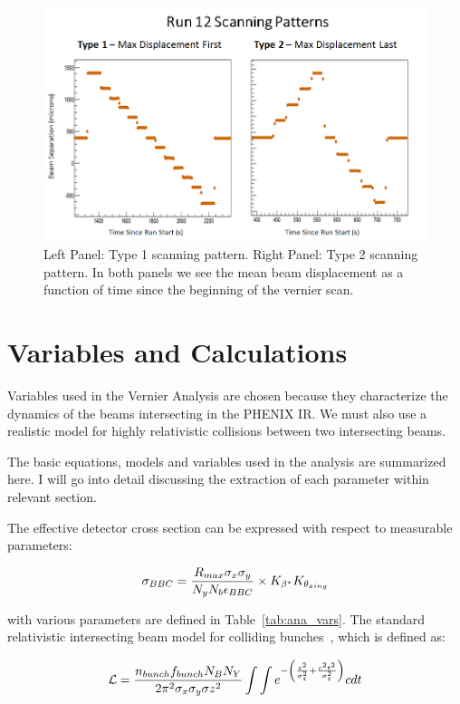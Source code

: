 \begin{figure}[ht] 
  \centering
  \includegraphics[width=0.75\linewidth]{./figures/scan_patterns} 
  \caption{ 
    Left Panel: Type 1 scanning pattern. Right Panel: Type 2 scanning pattern.
    In both panels we see the mean beam displacement as a function of time
    since the beginning of the vernier scan.
  }
  \label{fig:scan_patterns}
\end{figure}

\section{Variables and Calculations}
\label{sec:VariablesAndCalculations}

Variables used in the Vernier Analysis are chosen because they characterize the
dynamics of the beams intersecting in the PHENIX IR. We must also use a
realistic model for highly relativistic collisions between two intersecting
beams.

The basic equations, models and variables used in the analysis are summarized
here. I will go into detail discussing the extraction of each parameter within
relevant section.

The effective detector cross section can be expressed with respect to
measurable parameters:

\begin{equation}
  \sigma_{BBC} = {{R_{max}\sigma_x\sigma_y}\over{N_y N_b
\epsilon_{BBC}}}\times{K_{\beta^*}K_{\theta_{xing}}}
\end{equation}

{\noindent}with various parameters are defined in Table~\ref{tab:ana_vars}.
\clearpage
The standard relativistic intersecting beam model for colliding
bunches~\cite{AN888Datta2010}, which is defined as:

\begin{equation}
\label{eq:reletivistic_beam_final} 
\mathcal{L} = {{n_{bunch} f_{bunch} N_{B} N_{Y} }\over{ 2 \pi^{2} \sigma_{x}
\sigma_{y}\sigma{z}^2}} \int \int
e^{-\left({{z^{2}}\over{\sigma_{z}^{2}}}+{{c^{2}t^{2}}\over{\sigma_{z}^{2}}}\right)} c dt
\end{equation}

